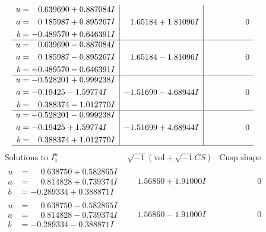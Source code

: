 \documentclass[1p]{elsarticle_modified}
\theoremstyle{definition}
\newcommand{\I}{\sqrt{-1}}
\begin{document}
$$\begin{array}{c|c|c}
\begin{aligned}
u &= \phantom{-}0.639690 + 0.887084 I \\
a &= \phantom{-}0.185987 + 0.895267 I \\
b &= -0.489570 + 0.646391 I\end{aligned}
 & \phantom{-}1.65184 + 1.81096 I & \phantom{-0.000000 } 0 \\ \hline\begin{aligned}
u &= \phantom{-}0.639690 - 0.887084 I \\
a &= \phantom{-}0.185987 - 0.895267 I \\
b &= -0.489570 - 0.646391 I\end{aligned}
 & \phantom{-}1.65184 - 1.81096 I & \phantom{-0.000000 } 0 \\ \hline\begin{aligned}
u &= -0.528201 + 0.999238 I \\
a &= -0.19425 - 1.59774 I \\
b &= \phantom{-}0.388374 - 1.012770 I\end{aligned}
 & -1.51699 - 4.68944 I & \phantom{-0.000000 } 0 \\ \hline\begin{aligned}
u &= -0.528201 - 0.999238 I \\
a &= -0.19425 + 1.59774 I \\
b &= \phantom{-}0.388374 + 1.012770 I\end{aligned}
 & -1.51699 + 4.68944 I & \phantom{-0.000000 } 0\\
 \hline 
 \end{array}$$\newpage$$\begin{array}{c|c|c}  
\text{Solutions to }I^u_{1}& \I (\text{vol} + \sqrt{-1}CS) & \text{Cusp shape}\\
 \hline 
\begin{aligned}
u &= \phantom{-}0.638750 + 0.582865 I \\
a &= \phantom{-}0.814828 + 0.739374 I \\
b &= -0.289334 + 0.388871 I\end{aligned}
 & \phantom{-}1.56860 + 1.91000 I & \phantom{-0.000000 } 0 \\ \hline\begin{aligned}
u &= \phantom{-}0.638750 - 0.582865 I \\
a &= \phantom{-}0.814828 - 0.739374 I \\
b &= -0.289334 - 0.388871 I\end{aligned}
 & \phantom{-}1.56860 - 1.91000 I & \phantom{-0.000000 } 0 \\ \hline\begin{aligned}

\end{aligned}
\end{array}$$
\end{document}
